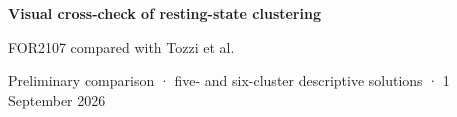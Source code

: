 \documentclass[aspectratio=169,10pt]{beamer}
\begin{document}
\begin{frame}[plain]
  \vfill
  \vspace{.30cm}

  {\color{Navy}\fontsize{28}{32}\selectfont\bfseries Visual cross-check of resting-state clustering\par}
  \vspace{.18cm}
  {\color{Muted}\Large FOR2107 compared with Tozzi et al.\par}
  \vspace{.48cm}
  \vfill
  {\color{Muted}\small Preliminary comparison · five- and six-cluster descriptive solutions · 1 September 2026}
\end{frame}
\end{document}
